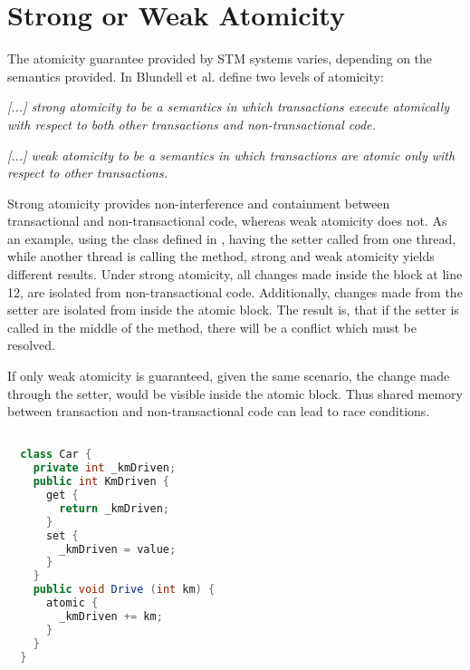 \section{Strong or Weak Atomicity}
\label{sec:design_strong_weak_atomicity}
The atomicity guarantee provided by \ac{STM} systems varies, depending on the semantics provided. In \cite{blundell2006subtleties} Blundell et al. define two levels of atomicity:
%
\begin{defn}\label{def:strong_atomicity}
\emph{[...] strong atomicity to be a semantics in which transactions execute atomically
with respect to both other transactions and non-transactional code.}
\end{defn}
%
\begin{defn}\label{def:weak_atomicity}
\emph{[...] weak atomicity to be a semantics in which transactions are atomic only with respect to other transactions.}
\end{defn}

Strong atomicity provides non-interference and containment between transactional and non-transactional code, whereas weak atomicity does not. As an example, using the  class defined in , having the  setter called from one thread, while another thread is calling the  method, strong and weak atomicity yields different results. Under strong atomicity, all changes made inside the  block at line 12, are isolated from non-transactional code. Additionally, changes made from the setter are isolated from inside the atomic block. The result is, that if the setter is called in the middle of the  method, there will be a conflict which must be resolved. 

If only weak atomicity is guaranteed, given the same scenario, the change made through the setter, would be visible inside the atomic block. Thus shared memory between transaction and non-transactional code can lead to race conditions.
%

\begin{lstlisting}[label=lst:atomicity,
  caption={Level of Atomicity},
  language=Java,  
  showspaces=false,
  showtabs=false,
  breaklines=true,
  showstringspaces=false,
  breakatwhitespace=true,
  commentstyle=\color{greencomments},
  keywordstyle=\color{bluekeywords},
  stringstyle=\color{redstrings},
  morekeywords={atomic, retry, orElse, var, get, set}]  % Start your code-block

  class Car {
    private int _kmDriven;
    public int KmDriven {
      get {
        return _kmDriven;
      }
      set {
        _kmDriven = value;
      }
    }
    public void Drive (int km) {
      atomic {
        _kmDriven += km;
      }
    }
  }
\end{lstlisting}

